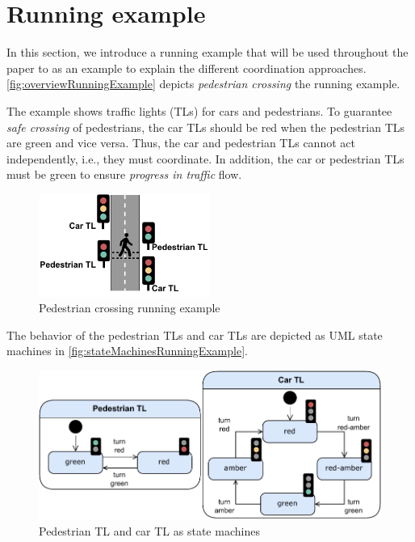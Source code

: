 \documentclass[runningheads]{llncs}
\begin{document}
\section{Running example}
In this section, we introduce a running example that will be used throughout the paper to as an example to explain the different coordination approaches.
\autoref{fig:overviewRunningExample} depicts \textit{pedestrian crossing} the running example.

The example shows traffic lights (TLs) for cars and pedestrians.
To guarantee \textit{safe crossing} of pedestrians, the car TLs should be red when the pedestrian TLs are green and vice versa.
Thus, the car and pedestrian TLs cannot act independently, i.e., they must coordinate.
In addition, the car or pedestrian TLs must be green to ensure \textit{progress in traffic} flow.

\begin{figure}[ht]
	\centering
	\includegraphics[width=0.5\textwidth]{images/running_example_schematic}
	\caption{Pedestrian crossing running example}
	\label{fig:overviewRunningExample}
\end{figure}

The behavior of the pedestrian TLs and car TLs are depicted as UML state machines \cite{objectmanagementgroupUnifiedModelingLanguage2017} in \autoref{fig:stateMachinesRunningExample}.

\begin{figure}[ht]
	\centering
	\includegraphics[width=1\textwidth]{images/running_example_models}
	\caption{Pedestrian TL and car TL as state machines}
	\label{fig:stateMachinesRunningExample}
\end{figure}
\end{document}
